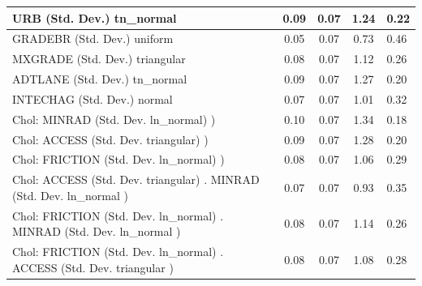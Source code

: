\begin{table}
\begin{center}
\begin{tabular}{|l|l|c|c|c|l|}
			\hline
			URB (Std. Dev.) tn_normal &  & 0.09 & 0.07 & 1.24 & 0.22 \\
			\hline
			GRADEBR (Std. Dev.) uniform &  & 0.05 & 0.07 & 0.73 & 0.46 \\
			\hline
			MXGRADE (Std. Dev.) triangular &  & 0.08 & 0.07 & 1.12 & 0.26 \\
			\hline
			ADTLANE (Std. Dev.) tn_normal &  & 0.09 & 0.07 & 1.27 & 0.20 \\
			\hline
			INTECHAG (Std. Dev.) normal &  & 0.07 & 0.07 & 1.01 & 0.32 \\
			\hline
			 Chol: MINRAD (Std. Dev. ln_normal) ) &  & 0.10 & 0.07 & 1.34 & 0.18 \\
			\hline
			 Chol: ACCESS (Std. Dev. triangular) ) &  & 0.09 & 0.07 & 1.28 & 0.20 \\
			\hline
			 Chol: FRICTION (Std. Dev. ln_normal) ) &  & 0.08 & 0.07 & 1.06 & 0.29 \\
			\hline
			 Chol: ACCESS (Std. Dev. triangular) . MINRAD (Std. Dev.   ln_normal ) &  & 0.07 & 0.07 & 0.93 & 0.35 \\
			\hline
			 Chol: FRICTION (Std. Dev. ln_normal) . MINRAD (Std. Dev.   ln_normal ) &  & 0.08 & 0.07 & 1.14 & 0.26 \\
			\hline
			 Chol: FRICTION (Std. Dev. ln_normal) . ACCESS (Std. Dev.   triangular ) &  & 0.08 & 0.07 & 1.08 & 0.28 \\
			\hline
		\end{tabular}
	\end{center}
\end{table}